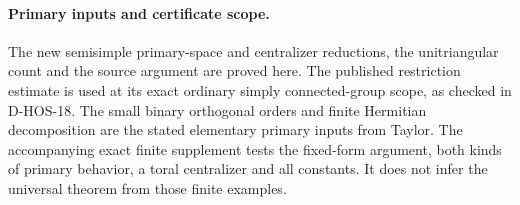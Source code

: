 \paragraph{Primary inputs and certificate scope.}
The new semisimple primary-space and centralizer reductions, the
unitriangular count and the source argument are proved here.
The published restriction estimate is used at its exact ordinary
simply connected-group scope, as checked in D-HOS-18. The small
binary orthogonal orders and finite Hermitian decomposition are
the stated elementary primary inputs from Taylor. The accompanying
exact finite supplement tests the fixed-form argument, both kinds
of primary behavior, a toral centralizer and all constants. It
does not infer the universal theorem from those finite examples.
